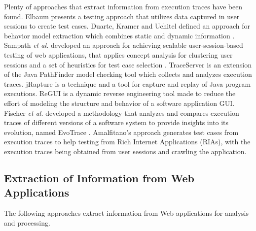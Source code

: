 Plenty of approaches that extract information from execution traces have been found. Elbaum \cite{elbaum2003improving} presents a testing approach that utilizes data captured in user sessions to create test cases. Duarte, Kramer and Uchitel defined an approach for behavior model extraction which combines static and dynamic information \cite{duarte2006model}. Sampath \textit{et al.} developed an approach for achieving scalable user-session-based testing of web applications, that applies concept analysis for clustering user sessions and a set of heuristics for test case selection \cite{sampath2007applying}. TraceServer \cite{andjelkovic2011trace} is an extension of the Java PathFinder model checking tool \cite{jpf} which collects and analyzes execution traces. jRapture \cite{steven2000jrapture} is a technique and a tool for capture and replay of Java program executions. ReGUI \cite{coimbra2011reverse,coimbra2012dynamic} is a dynamic reverse engineering tool made to reduce the effort of modeling the structure and behavior of a software application GUI.  Fischer \textit{et al.} developed a methodology that analyzes and compares execution traces of different versions of a software system to provide insights into its evolution, named EvoTrace \cite{fischer2005system}. Amalfitano's approach \cite{amalfitano2010rich} generates test cases from execution traces to help testing from Rich Internet Applications (RIAs), with the execution traces being obtained from user sessions and crawling the application. 

\subsection{Extraction of Information from Web Applications}

The following approaches extract information from Web applications for analysis and processing. 

